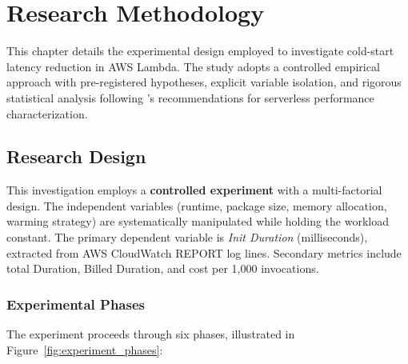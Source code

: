 \chapter{Research Methodology}
\label{ch:methodology}

This chapter details the experimental design employed to investigate cold-start latency reduction in AWS Lambda. The study adopts a controlled empirical approach with pre-registered hypotheses, explicit variable isolation, and rigorous statistical analysis following \citet{wen2025variance}'s recommendations for serverless performance characterization.

\section{Research Design}

This investigation employs a \textbf{controlled experiment} with a multi-factorial design. The independent variables (runtime, package size, memory allocation, warming strategy) are systematically manipulated while holding the workload constant. The primary dependent variable is \textit{Init Duration} (milliseconds), extracted from AWS CloudWatch REPORT log lines. Secondary metrics include total Duration, Billed Duration, and cost per 1,000 invocations.

\subsection{Experimental Phases}

The experiment proceeds through six phases, illustrated in Figure~\ref{fig:experiment_phases}:


